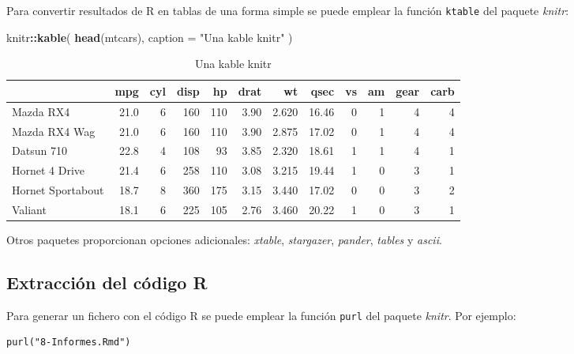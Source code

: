 \documentclass[]{book}
\newenvironment{Shaded}{\begin{snugshade}}{\end{snugshade}}
\newcommand{\KeywordTok}[1]{\textcolor[rgb]{0.13,0.29,0.53}{\textbf{#1}}}
\newcommand{\DataTypeTok}[1]{\textcolor[rgb]{0.13,0.29,0.53}{#1}}
\newcommand{\StringTok}[1]{\textcolor[rgb]{0.31,0.60,0.02}{#1}}
\newcommand{\OperatorTok}[1]{\textcolor[rgb]{0.81,0.36,0.00}{\textbf{#1}}}
\newcommand{\NormalTok}[1]{#1}
\begin{document}
Para convertir resultados de R en tablas de una forma simple se puede
emplear la función \texttt{ktable} del paquete \emph{knitr}:

\begin{Shaded}
\begin{Highlighting}[]
\NormalTok{knitr}\OperatorTok{::}\KeywordTok{kable}\NormalTok{(}
  \KeywordTok{head}\NormalTok{(mtcars), }
  \DataTypeTok{caption =} \StringTok{"Una kable knitr"}
\NormalTok{)}
\end{Highlighting}
\end{Shaded}

\begin{table}[t]

\caption{\label{tab:kable}Una kable knitr}
\centering
\begin{tabular}{l|r|r|r|r|r|r|r|r|r|r|r}
\hline
  & mpg & cyl & disp & hp & drat & wt & qsec & vs & am & gear & carb\\
\hline
Mazda RX4 & 21.0 & 6 & 160 & 110 & 3.90 & 2.620 & 16.46 & 0 & 1 & 4 & 4\\
\hline
Mazda RX4 Wag & 21.0 & 6 & 160 & 110 & 3.90 & 2.875 & 17.02 & 0 & 1 & 4 & 4\\
\hline
Datsun 710 & 22.8 & 4 & 108 & 93 & 3.85 & 2.320 & 18.61 & 1 & 1 & 4 & 1\\
\hline
Hornet 4 Drive & 21.4 & 6 & 258 & 110 & 3.08 & 3.215 & 19.44 & 1 & 0 & 3 & 1\\
\hline
Hornet Sportabout & 18.7 & 8 & 360 & 175 & 3.15 & 3.440 & 17.02 & 0 & 0 & 3 & 2\\
\hline
Valiant & 18.1 & 6 & 225 & 105 & 2.76 & 3.460 & 20.22 & 1 & 0 & 3 & 1\\
\hline
\end{tabular}
\end{table}

Otros paquetes proporcionan opciones adicionales: \emph{xtable},
\emph{stargazer}, \emph{pander}, \emph{tables} y \emph{ascii}.

\subsection{Extracción del código R}\label{extraccion-del-codigo-r}

Para generar un fichero con el código R se puede emplear la función
\texttt{purl} del paquete \emph{knitr}. Por ejemplo:

\begin{verbatim}
purl("8-Informes.Rmd")
\end{verbatim}
\end{document}
